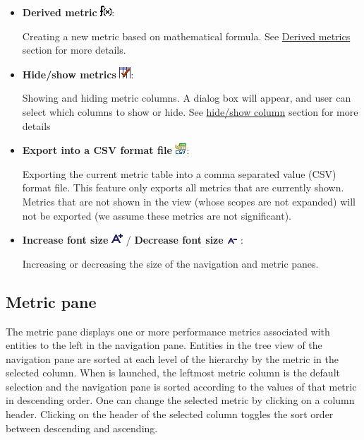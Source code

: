 \begin{itemize}
\item \textbf{Derived metric} \includegraphics[scale=.8]{fig/FnMetric.png}:

Creating a new metric based on mathematical formula.
See \hyperlink{derivedmetrics}{Derived metrics} section for more details.

\item \textbf{Hide/show metrics} \includegraphics[scale=.8]{fig/checkColumns.png}:

Showing and hiding metric columns. A dialog box will appear, and user can select which columns to show or hide. See \hyperlink{hideshowcolumn}{hide/show column} section for more details

\item \textbf{Export into a CSV format file} \includegraphics[scale=.8]{fig/savecsv.png}:

Exporting the current metric table into a comma separated value (CSV) format file. This feature only exports all metrics that are currently shown. Metrics that are not shown in the view (whose scopes are not expanded) will not be exported (we assume these metrics are not significant).

\item \textbf{Increase font size} \includegraphics[scale=.8]{fig/FontBigger.png} /
      \textbf{Decrease font size} \includegraphics[scale=.8]{fig/FontSmaller.png} :

Increasing or decreasing the size of the navigation and metric panes.

\end{itemize}


\subsection{Metric pane} The metric pane displays one or more performance metrics associated with entities to the left in the navigation pane. Entities in the tree view of the navigation pane are sorted at each level of the hierarchy by the metric in the selected column. When \hpcviewer{} is launched, the leftmost metric column is the default selection and the navigation pane is sorted according to the values of that metric in descending order. One can change the selected metric by clicking on a column header. Clicking on the header of the selected column toggles the sort order between descending and ascending.

